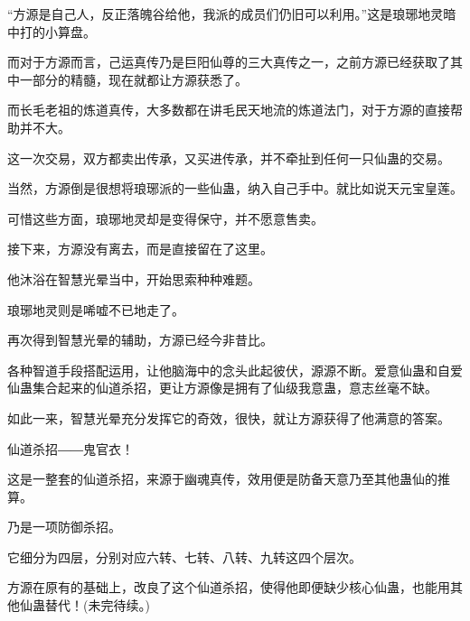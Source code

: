 \begin{this_body}
“方源是自己人，反正落魄谷给他，我派的成员们仍旧可以利用。”这是琅琊地灵暗中打的小算盘。

而对于方源而言，己运真传乃是巨阳仙尊的三大真传之一，之前方源已经获取了其中一部分的精髓，现在就都让方源获悉了。

而长毛老祖的炼道真传，大多数都在讲毛民天地流的炼道法门，对于方源的直接帮助并不大。

这一次交易，双方都卖出传承，又买进传承，并不牵扯到任何一只仙蛊的交易。

当然，方源倒是很想将琅琊派的一些仙蛊，纳入自己手中。就比如说天元宝皇莲。

可惜这些方面，琅琊地灵却是变得保守，并不愿意售卖。

接下来，方源没有离去，而是直接留在了这里。

他沐浴在智慧光晕当中，开始思索种种难题。

琅琊地灵则是唏嘘不已地走了。

再次得到智慧光晕的辅助，方源已经今非昔比。

各种智道手段搭配运用，让他脑海中的念头此起彼伏，源源不断。爱意仙蛊和自爱仙蛊集合起来的仙道杀招，更让方源像是拥有了仙级我意蛊，意志丝毫不缺。

如此一来，智慧光晕充分发挥它的奇效，很快，就让方源获得了他满意的答案。

仙道杀招――鬼官衣！

这是一整套的仙道杀招，来源于幽魂真传，效用便是防备天意乃至其他蛊仙的推算。

乃是一项防御杀招。

它细分为四层，分别对应六转、七转、八转、九转这四个层次。

方源在原有的基础上，改良了这个仙道杀招，使得他即便缺少核心仙蛊，也能用其他仙蛊替代！(未完待续。)

\end{this_body}

